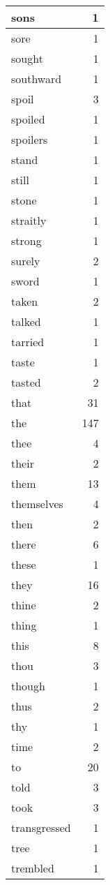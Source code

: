 \begin{center}
\begin{longtable}{l|r}
sons & 1 \\ \hline
sore & 1 \\ \hline
sought & 1 \\ \hline
southward & 1 \\ \hline
spoil & 3 \\ \hline
spoiled & 1 \\ \hline
spoilers & 1 \\ \hline
stand & 1 \\ \hline
still & 1 \\ \hline
stone & 1 \\ \hline
straitly & 1 \\ \hline
strong & 1 \\ \hline
surely & 2 \\ \hline
sword & 1 \\ \hline
taken & 2 \\ \hline
talked & 1 \\ \hline
tarried & 1 \\ \hline
taste & 1 \\ \hline
tasted & 2 \\ \hline
that & 31 \\ \hline
the & 147 \\ \hline
thee & 4 \\ \hline
their & 2 \\ \hline
them & 13 \\ \hline
themselves & 4 \\ \hline
then & 2 \\ \hline
there & 6 \\ \hline
these & 1 \\ \hline
they & 16 \\ \hline
thine & 2 \\ \hline
thing & 1 \\ \hline
this & 8 \\ \hline
thou & 3 \\ \hline
though & 1 \\ \hline
thus & 2 \\ \hline
thy & 1 \\ \hline
time & 2 \\ \hline
to & 20 \\ \hline
told & 3 \\ \hline
took & 3 \\ \hline
transgressed & 1 \\ \hline
tree & 1 \\ \hline
trembled & 1 \\ \hline

\end{longtable}
\end{center}
